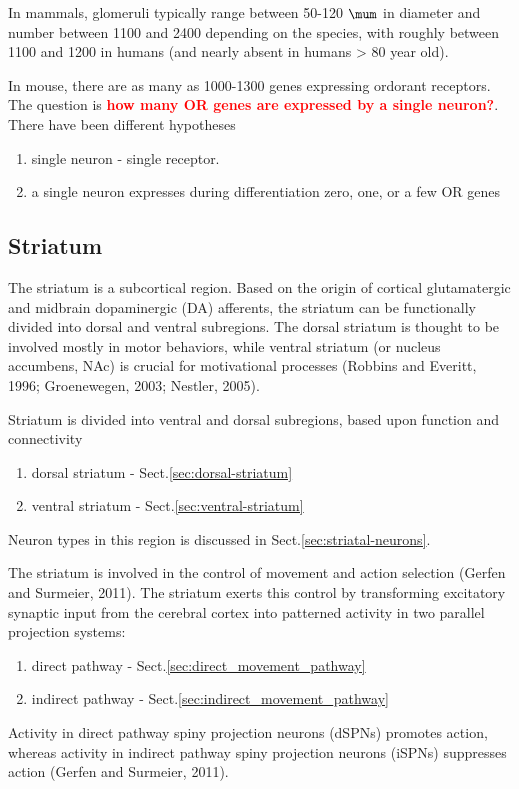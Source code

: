 In mammals, glomeruli typically range between 50-120 $\mum$ in diameter and
number between 1100 and 2400 depending on the species, with roughly between 1100
and 1200 in humans (and nearly absent in humans > 80 year old).


In mouse, there are  as many as 1000-1300 genes expressing ordorant receptors. 
The question is \textcolor{red}{\bf how many OR genes are expressed by a single
neuron?}. There have been different hypotheses 
\begin{enumerate}
  \item single neuron - single receptor.
  
  \item a single neuron expresses during differentiation zero, one, or a few OR
  genes
\end{enumerate}


\subsection{Striatum}
\label{sec:striatum}

The striatum is a subcortical region. Based on the origin of cortical
glutamatergic and midbrain dopaminergic (DA) afferents, the striatum can be
functionally divided into dorsal and ventral subregions. The dorsal striatum is
thought to be involved mostly in motor behaviors, while ventral striatum (or
nucleus accumbens, NAc) is crucial for motivational processes (Robbins and
Everitt, 1996; Groenewegen, 2003; Nestler, 2005).

Striatum is divided into ventral and dorsal subregions, based upon function and
connectivity
\begin{enumerate}
  \item dorsal striatum - Sect.\ref{sec:dorsal-striatum}
  \item ventral striatum - Sect.\ref{sec:ventral-striatum}
\end{enumerate}
Neuron types in this region is discussed in Sect.\ref{sec:striatal-neurons}.

The striatum is involved in the control of movement and action selection (Gerfen
and Surmeier, 2011). The striatum exerts this control by transforming excitatory
synaptic input from the cerebral cortex into patterned activity in two parallel
projection systems:
\begin{enumerate}
  \item direct pathway - Sect.\ref{sec:direct_movement_pathway}
  
  \item indirect pathway - Sect.\ref{sec:indirect_movement_pathway}
\end{enumerate}
Activity in direct pathway spiny projection neurons (dSPNs) promotes action,
whereas activity in indirect pathway spiny projection neurons (iSPNs) suppresses
action (Gerfen and Surmeier, 2011).


